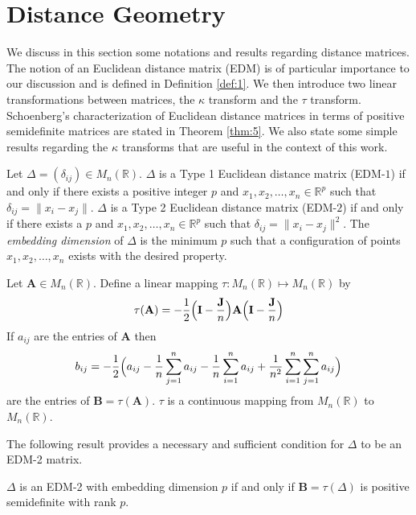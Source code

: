 \section{Distance Geometry}
\label{sec:distance-geometry}
We discuss in this section some notations and results regarding
distance matrices. The notion of an Euclidean distance matrix (EDM) is
of particular importance to our discussion and is defined in
Definition \ref{def:1}. We then introduce two linear transformations
between matrices, the $\kappa$ transform and the $\tau$ transform.
Schoenberg's characterization \citep{schoenberg38:_metric} of Euclidean
distance matrices in terms of positive semidefinite matrices are
stated in Theorem \ref{thm:5}. We also state some simple results
regarding the $\kappa$ transforms that are useful in the context of
this work.

\begin{definition}
  \label{def:10}
  Let $\Delta = (\delta_{ij}) \in M_n(\mathbb{R})$. $\Delta$ is a Type 1
  Euclidean distance matrix (EDM-$1$) if and only if there exists a
  positive integer $p$ and $x_1, x_2, \dots, x_n \in \mathbb{R}^{p}$
  such that $\delta_{ij} = \| x_i - x_j \|$. $\Delta$ is a Type 2
  Euclidean distance matrix (EDM-$2$) if and only if there exists a
  $p$ and $x_1, x_2, \dots, x_n \in \mathbb{R}^{p}$ such that
  $\delta_{ij} = \|x_i - x_j\|^{2}$. The {\em embedding dimension} of
  $\Delta$ is the minimum $p$ such that a configuration of points
  $x_1, x_2, \dots, x_n$ exists with the desired property.
\end{definition}

\begin{definition}
  \label{def:11}
  Let $\mathbf{A} \in M_n(\mathbb{R})$. Define a linear mapping $\tau \colon M_n(\mathbb{R})
  \mapsto M_n(\mathbb{R})$ by
  \begin{equation}
    \label{eq:55}
    \tau(\mathbf{A}) = - \frac{1}{2} \Bigl(\mathbf{I} -
    \frac{\mathbf{J}}{n}\Bigr)\mathbf{A} \Bigl(\mathbf{I} - \frac{\mathbf{J}}{n}\Bigr)
  \end{equation}
  If $a_{ij}$ are the entries of $\mathbf{A}$ then
  \begin{equation}
    \label{eq:56}
    b_{ij} = -\frac{1}{2}\Bigl(a_{ij} - \frac{1}{n}\sum_{j=1}^{n}a_{ij} -
    \frac{1}{n}\sum_{i=1}^{n}{a_{ij}} +
      \frac{1}{n^2}\sum_{i=1}^{n}\sum_{j=1}^{n}a_{ij}\Bigr)
  \end{equation}
  are the entries of $\mathbf{B} = \tau(\mathbf{A})$. $\tau$
  is a continuous mapping from $M_n(\mathbb{R})$ to
  $M_n(\mathbb{R})$. 
\end{definition}
%
The following result provides a necessary and sufficient condition for
$\Delta$ to be an EDM-2 matrix.
\begin{theorem}
  \label{thm:5}
  $\Delta$ is an EDM-2 with embedding dimension $p$ if and only
  if $\mathbf{B} = \tau(\Delta)$ is positive semidefinite with rank
  $p$. 
\end{theorem}

